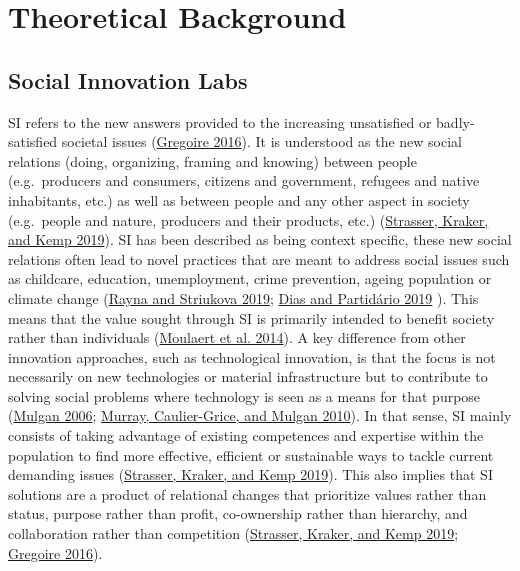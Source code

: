 \documentclass[AMA,STIX1COL,APA,STIX2COL]{WileyNJD-v2}
\begin{document}
\hypertarget{theoretical-background}{%
\section{Theoretical Background}\label{theoretical-background}}

\hypertarget{social-innovation-labs}{%
\subsection{Social Innovation Labs}\label{social-innovation-labs}}

SI refers to the new answers provided to the increasing unsatisfied or
badly-satisfied societal issues
(\protect\hyperlink{ref-Gregoire2016}{Gregoire 2016}). It is understood
as the new social relations (doing, organizing, framing and knowing)
between people (e.g.~producers and consumers, citizens and government,
refugees and native inhabitants, etc.) as well as between people and any
other aspect in society (e.g.~people and nature, producers and their
products, etc.) (\protect\hyperlink{ref-Strasser2019}{Strasser, Kraker,
and Kemp 2019}). SI has been described as being context specific, these
new social relations often lead to novel practices that are meant to
address social issues such as childcare, education, unemployment, crime
prevention, ageing population or climate change
(\protect\hyperlink{ref-Rayna2019}{Rayna and Striukova 2019};
\protect\hyperlink{ref-Dias2019}{Dias and Partidário 2019} ). This means
that the value sought through SI is primarily intended to benefit
society rather than individuals
(\protect\hyperlink{ref-Moulaert2014}{Moulaert et al. 2014}). A key
difference from other innovation approaches, such as technological
innovation, is that the focus is not necessarily on new technologies or
material infrastructure but to contribute to solving social problems
where technology is seen as a means for that purpose
(\protect\hyperlink{ref-Mulgan2006}{Mulgan 2006};
\protect\hyperlink{ref-Murray2010}{Murray, Caulier-Grice, and Mulgan
2010}). In that sense, SI mainly consists of taking advantage of
existing competences and expertise within the population to find more
effective, efficient or sustainable ways to tackle current demanding
issues (\protect\hyperlink{ref-Strasser2019}{Strasser, Kraker, and Kemp
2019}). This also implies that SI solutions are a product of relational
changes that prioritize values rather than status, purpose rather than
profit, co-ownership rather than hierarchy, and collaboration rather
than competition (\protect\hyperlink{ref-Strasser2019}{Strasser, Kraker,
and Kemp 2019}; \protect\hyperlink{ref-Gregoire2016}{Gregoire 2016}).
\end{document}
